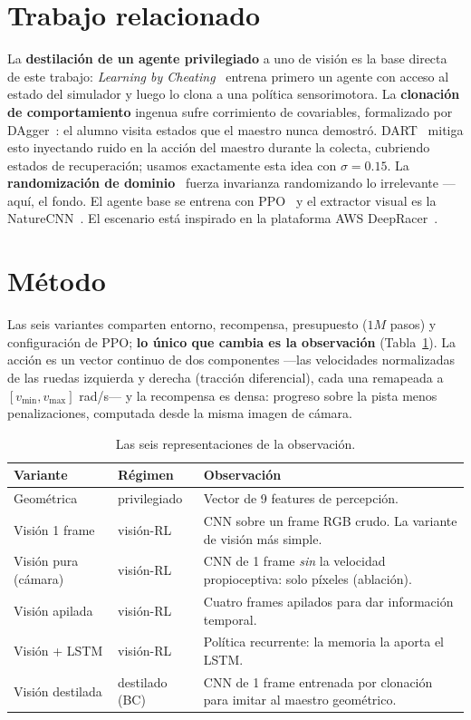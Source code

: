 \documentclass[conference]{IEEEtran}
\begin{document}
\section{Trabajo relacionado}
La \textbf{destilaci\'on de un agente privilegiado} a uno de visi\'on es la base directa de
este trabajo: \emph{Learning by Cheating}~\cite{chen2019lbc} entrena primero un agente con
acceso al estado del simulador y luego lo clona a una pol\'itica sensorimotora. La
\textbf{clonaci\'on de comportamiento} ingenua sufre corrimiento de covariables, formalizado
por DAgger~\cite{ross2011dagger}: el alumno visita estados que el maestro nunca demostr\'o.
DART~\cite{laskey2017dart} mitiga esto inyectando ruido en la acci\'on del maestro durante la
colecta, cubriendo estados de recuperaci\'on; usamos exactamente esta idea con
$\sigma = 0.15$. La \textbf{randomizaci\'on de dominio}~\cite{tobin2017domain} fuerza
invarianza randomizando lo irrelevante ---aqu\'i, el fondo. El agente base se entrena con
PPO~\cite{schulman2017ppo} y el extractor visual es la NatureCNN~\cite{mnih2015dqn}. El
escenario est\'a inspirado en la plataforma AWS DeepRacer~\cite{balaji2020deepracer}.

\section{M\'etodo}
Las seis variantes comparten entorno, recompensa, presupuesto ($1M$ pasos) y configuraci\'on
de PPO; \textbf{lo \'unico que cambia es la observaci\'on} (Tabla~\ref{tab:variants}). La
acci\'on es un vector continuo de dos componentes ---las velocidades normalizadas de las ruedas
izquierda y derecha (tracci\'on diferencial), cada una remapeada a $[v_{\min}, v_{\max}]$ rad/s---
y la recompensa es densa: progreso sobre la pista menos penalizaciones, computada desde la misma
imagen de c\'amara.

\begin{table}[H]
\caption{Las seis representaciones de la observaci\'on.}
\label{tab:variants}
\centering
\small
\begin{tabular}{@{}p{1.7cm}p{1.5cm}p{4.0cm}@{}}
\toprule
\textbf{Variante} & \textbf{R\'egimen} & \textbf{Observaci\'on} \\
\midrule
Geom\'etrica & privilegiado & Vector de 9 features de percepci\'on. \\
Visi\'on 1 frame & visi\'on-RL & CNN sobre un frame RGB crudo. La variante de visi\'on m\'as simple. \\
Visi\'on pura (c\'amara) & visi\'on-RL & CNN de 1 frame \emph{sin} la velocidad propioceptiva: solo p\'ixeles (ablaci\'on). \\
Visi\'on apilada & visi\'on-RL & Cuatro frames apilados para dar informaci\'on temporal. \\
Visi\'on + LSTM & visi\'on-RL & Pol\'itica recurrente: la memoria la aporta el LSTM. \\
Visi\'on destilada & destilado (BC) & CNN de 1 frame entrenada por clonaci\'on para imitar al maestro geom\'etrico. \\
\bottomrule
\end{tabular}
\end{table}
\end{document}
